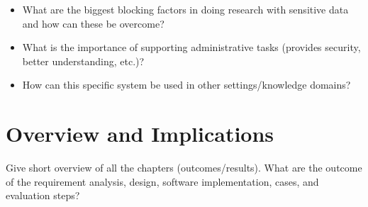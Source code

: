 \begin{itemize}
	\item What are the biggest blocking factors in doing research with sensitive data and how can these be overcome?
	\item What is the importance of supporting administrative tasks (provides security, better understanding, etc.)? 
	\item How can this specific system be used in other settings/knowledge domains?
\end{itemize}

\section{Overview and Implications}
Give short overview of all the chapters (outcomes/results).
What are the outcome of the requirement analysis, design, software implementation, cases, and evaluation steps?